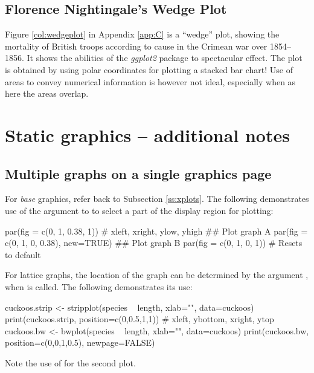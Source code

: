 \subsection*{Florence Nightingale's Wedge Plot}

Figure \ref{col:wedgeplot} in Appendix \ref{app:C} is a ``wedge''
plot, showing the mortality of British troops according to cause in
the Crimean war over 1854--1856. It shows the abilities of the {\em
  ggplot2} package to spectacular effect.  The plot is obtained by
using polar coordinates for plotting a stacked bar chart!  Use of
areas to convey numerical information is however not ideal, especially
when as here the areas overlap.


\section{Static graphics -- additional notes}
\subsection{Multiple graphs on a single graphics page}\label{ssec:xgph}

For \textit{base} graphics, refer back to Subsection \ref{ss:xplots}.
The following demonstrates use of the 
argument to  to select a part of the display region
for plotting:
\begin{Schunk}
\begin{Sinput}
par(fig = c(0, 1, 0.38, 1))
          # xleft, xright, ylow, yhigh
## Plot graph A
par(fig = c(0, 1, 0, 0.38), new=TRUE)
## Plot graph B
par(fig = c(0, 1, 0, 1))     # Resets to default
\end{Sinput}
\end{Schunk}
For lattice graphs, the location of the graph can be determined
by the argument , when  is called.
The following demonstrates its use:
\begin{fullwidth}
\begin{Schunk}
\begin{Sinput}
cuckoos.strip <- stripplot(species ~ length, xlab="", data=cuckoos)
print(cuckoos.strip, position=c(0,0.5,1,1))
                   # xleft, ybottom, xright, ytop
cuckoos.bw <- bwplot(species ~ length, xlab="", data=cuckoos)
print(cuckoos.bw, position=c(0,0,1,0.5), newpage=FALSE)
\end{Sinput}
\end{Schunk}
\end{fullwidth}
\noindent
Note the use of  for the second plot.

